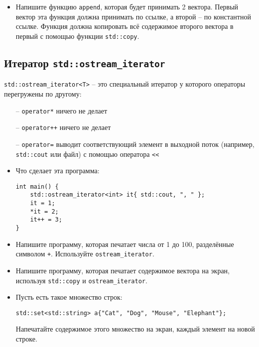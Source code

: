 \documentclass{article}
\begin{document}
\begin{itemize}
\item Напишите функцию \texttt{append}, которая будет принимать 2 вектора. Первый вектор эта функция должна принимать по ссылке, а второй -- по константной ссылке. Функция должна копировать всё содержимое второго вектора в первый с помощью функции \texttt{std::copy}.
\end{itemize}

\subsection*{Итератор \texttt{std::ostream\_iterator}}
\texttt{std::ostream\_iterator<T>} -- это специальный итератор у которого операторы перегружены по другому:
\begin{itemize}
\item[--] \texttt{operator*} ничего не делает
\item[--] \texttt{operator++} ничего не делает
\item[--] \texttt{operator=} выводит соответствующий элемент в выходной поток (например, \texttt{std::cout} или файл) с помощью оператора \texttt{<{}<} 
\end{itemize}

\begin{itemize}
\item Что сделает эта программа:
\begin{lstlisting}
int main() {
    std::ostream_iterator<int> it{ std::cout, ", " };
    it = 1;
    *it = 2;
    it++ = 3;
}
\end{lstlisting}
\item Напишите программу, которая печатает числа от 1 до 100, разделённые символом \texttt{+}. Используйте \texttt{ostream\_iterator}.
\item Напишите программу, которая печатает содержимое вектора на экран, используя \texttt{std::copy} и \texttt{ostream\_iterator}.
\item Пусть есть такое множество строк:
\begin{lstlisting}
std::set<std::string> a{"Cat", "Dog", "Mouse", "Elephant"};
\end{lstlisting}
Напечатайте содержимое этого множество на экран, каждый элемент на новой строке.
\end{itemize}
\end{document}
